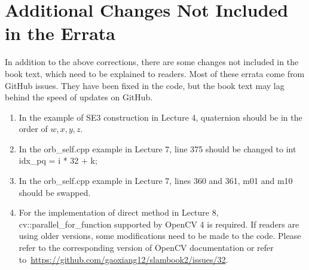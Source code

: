 \documentclass[lang=en,11pt,numbers]{errata}
\begin{document}
\section{Additional Changes Not Included in the Errata}
In addition to the above corrections, there are some changes not included in the book text, which need to be explained to readers. Most of these errata come from GitHub issues. They have been fixed in the code, but the book text may lag behind the speed of updates on GitHub.

\begin{enumerate}
\item In the example of SE3 construction in Lecture 4, quaternion should be in the order of $w,x,y,z$.
\item In the orb_self.cpp example in Lecture 7, line 375 should be changed to int idx_pq = i * 32 + k;
\item In the orb_self.cpp example in Lecture 7, lines 360 and 361, m01 and m10 should be swapped.
\item For the implementation of direct method in Lecture 8, cv::parallel_for_function supported by OpenCV 4 is required. If readers are using older versions, some modifications need to be made to the code. Please refer to the corresponding version of OpenCV documentation or refer to~\url{https://github.com/gaoxiang12/slambook2/issues/32}.
\end{enumerate}
\end{document}
